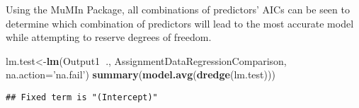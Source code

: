 \documentclass[]{article}
\newenvironment{Shaded}{\begin{snugshade}}{\end{snugshade}}
\newcommand{\KeywordTok}[1]{\textcolor[rgb]{0.13,0.29,0.53}{\textbf{#1}}}
\newcommand{\DataTypeTok}[1]{\textcolor[rgb]{0.13,0.29,0.53}{#1}}
\newcommand{\StringTok}[1]{\textcolor[rgb]{0.31,0.60,0.02}{#1}}
\newcommand{\OperatorTok}[1]{\textcolor[rgb]{0.81,0.36,0.00}{\textbf{#1}}}
\newcommand{\NormalTok}[1]{#1}
\begin{document}
Using the MuMIn Package, all combinations of predictors' AICs can be
seen to determine which combination of predictors will lead to the most
accurate model while attempting to reserve degrees of freedom.

\begin{Shaded}
\begin{Highlighting}[]
\NormalTok{lm.test<-}\KeywordTok{lm}\NormalTok{(Output1}\OperatorTok{~}\NormalTok{., AssignmentDataRegressionComparison, }\DataTypeTok{na.action=}\StringTok{'na.fail'}\NormalTok{)}
\KeywordTok{summary}\NormalTok{(}\KeywordTok{model.avg}\NormalTok{(}\KeywordTok{dredge}\NormalTok{(lm.test)))}
\end{Highlighting}
\end{Shaded}

\begin{verbatim}
## Fixed term is "(Intercept)"
\end{verbatim}
\end{document}
